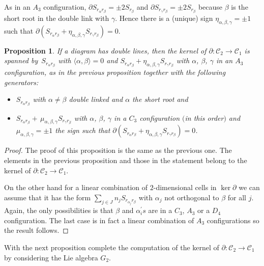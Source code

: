 \documentclass[pdftex]{sigma}
\numberwithin{equation}{section}
\newtheorem{Proposition}[Theorem]{Proposition}
 { \theoremstyle{definition}
\newtheorem{Definition}[Theorem]{Definition}
\newtheorem{Note}[Theorem]{Note}
\newtheorem{Example}[Theorem]{Example}
\newtheorem{Remark}[Theorem]{Remark} }
\begin{document}
As in an $A_{3}$ configuration, $\partial S_{r_{\alpha }r_{\beta }}=\pm 2S_{r_{\beta }}$ and $\partial S_{r_{\gamma }r_{\beta }}=\pm 2S_{r_{\beta }}$ because $\beta $ is the short root in the double link with $\gamma $. Hence there is a (unique) sign $\eta_{\alpha,\beta,\gamma }=\pm 1$ such that $\partial (S_{r_{\alpha }r_{\beta }}+\eta _{\alpha,\beta,\gamma}S_{r_{\gamma }r_{\beta }})=0$.

\begin{Proposition}\label{pro.double}If a diagram has double lines, then the kernel of $\partial \colon \mathcal{C}_{2}\longrightarrow \mathcal{C}_{1}$ is spanned by~$S_{r_{\alpha }r_{\beta }}$ with $\langle \alpha,\beta \rangle =0$ and $S_{r_{\alpha }r_{\beta }}+\eta _{\alpha,\beta,\gamma }S_{r_{\gamma }r_{\beta }}$ with $\alpha$, $\beta$, $\gamma $ in an $A_{3}$ configuration, as in the previous proposition together with the following generators:
\begin{itemize}\itemsep=0pt
\item $S_{r_{\alpha }r_{\beta }}$ with $\alpha \neq \beta $ double linked and $\alpha $ the short root and
\item $S_{r_{\alpha }r_{\beta }}+\,\mu _{\alpha,\beta,\gamma }S_{r_{\gamma}r_{\beta }}$ with $\alpha$, $\beta$, $\gamma $ in a $C_{3}$ configuration $($in this order$)$ and $\mu _{\alpha,\beta,\gamma }=\pm 1$ the sign such that $\partial ( S_{r_{\alpha }r_{\beta }}+\eta _{\alpha,\beta,\gamma}S_{r_{\gamma }r_{\beta }} ) =0$.
\end{itemize}
\end{Proposition}

\begin{proof} The proof of this proposition is the same as the previous one. The elements in the previous proposition and those in the statement belong to the kernel of $\partial \colon \mathcal{C}_{2}\longrightarrow \mathcal{C}_{1}$.

On the other hand for a linear combination of $2$-dimensional cells in $\ker \partial $ we can assume that it has the form $\sum\limits_{j\in J}n_{j}S_{r_{\alpha _{j}}r_{\beta }}$ with $\alpha _{j}$ not orthogonal to $\beta $ for all $j$. Again, the only possibilities is that $\beta $ and $\alpha _{i}^{\prime }s$ are in a $C_{3}$, $A_{3}$ or a $D_{4}$ configuration. The last case is in fact a linear combination of $A_{3}$ configurations so the result follows.
\end{proof}

With the next proposition complete the computation of the kernel of $\partial \colon \mathcal{C}_{2}\longrightarrow \mathcal{C}_{1}$ by considering the Lie algebra $G_{2}$.
\end{document}
